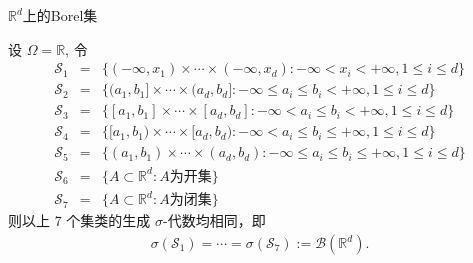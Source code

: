 \documentclass[Prob-All.tex]{subfiles}
\begin{document}
\begin{frame}{$\mathbb{R}^d$上的Borel集}
\begin{prop}
  设 $\Omega=\mathbb{R}$, 令
		\begin{eqnarray*}
			\mathcal{S}_1&=&\{(-\infty,x_1)\times\cdots\times(-\infty,x_d):-\infty<x_i<+\infty, 1\leq i\leq d\}\\
			\mathcal{S}_2&=&\{(a_1,b_1]\times\cdots\times(a_d,b_d]:-\infty\leq a_i\leq b_i<+\infty, 1\leq i\leq d\}\\
			\mathcal{S}_3&=&\{[a_1,b_1]\times\cdots\times[a_d,b_d]:-\infty< a_i\leq b_i<+\infty, 1\leq i\leq d\}\\
			\mathcal{S}_4&=&\{[a_1,b_1)\times\cdots\times [a_d,b_d):-\infty< a_i\leq b_i\leq+\infty, 1\leq i\leq d\}\\
			\mathcal{S}_5&=&\{(a_1,b_1)\times\cdots\times(a_d,b_d):-\infty\leq a_i\leq b_i\leq+\infty, 1\leq i\leq d\}\\
			\mathcal{S}_6&=&\{A\subset\mathbb{R}^d:A\mbox{为开集}\}\\
			\mathcal{S}_7&=&\{A\subset\mathbb{R}^d:A\mbox{为闭集}\}
		\end{eqnarray*}则以上 7 个集类的生成 $\sigma$-代数均相同，即
		\begin{eqnarray*}
			\sigma(\mathcal{S}_1)=\cdots=\sigma(\mathcal{S}_7):=\mathcal{B}(\mathbb{R}^d).
		\end{eqnarray*}
\end{prop}





\end{frame}
\end{document}
